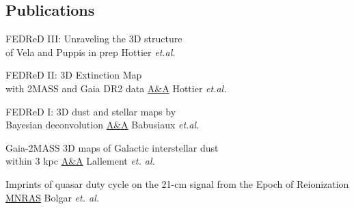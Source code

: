 \documentclass[
 a4paper, 9.5pt,
  sidebarwidth=0.3\paperwidth,
]{fortysecondscv}
\begin{document}
\makefrontsidebar

\begin{cvtable}
\end{cvtable}


\begin{cvtable}
\end{cvtable}

\subsection{Publications}
\begin{cvtable}
  {FEDReD III: Unraveling the 3D structure \\of Vela and Puppis}
  {in prep}
  {Hottier \textit{et.al.}}

  {FEDReD II: 3D Extinction Map\\ with 2MASS and Gaia DR2 data}
  {\href{https://ui.adsabs.harvard.edu/abs/2020arXiv200703734H/abstract}{A\&A}}
  {Hottier \textit{et.al.}}

  {FEDReD I: 3D dust and stellar maps by \\Bayesian deconvolution}
  {\href{https://ui.adsabs.harvard.edu/abs/2020arXiv200704455B/abstract}{A\&A}}
  {Babusiaux \textit{et.al.}}

  {Gaia-2MASS 3D maps of Galactic interstellar dust\\within 3 kpc}
  {\href{https://ui.adsabs.harvard.edu/\#abs/2019arXiv190204116L/abstract}{A\&A}}
  {Lallement \textit{et. al.}}

  {Imprints of quasar duty cycle on the 21-cm signal from the Epoch of Reionization}
  {\href{https://ui.adsabs.harvard.edu/\#abs/2019arXiv190204116L/abstract}{MNRAS}}
  {Bolgar \textit{et. al.}}
\end{cvtable}
\end{document}
